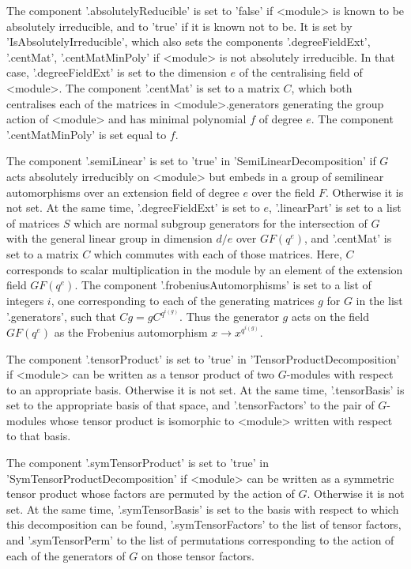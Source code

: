 The component  '.absolutelyReducible' is  set  to 'false' if  <module> is
known to be  absolutely irreducible, and to 'true'  if it is known not to
be.  It  is  set   by  'IsAbsolutelyIrreducible',  which  also  sets  the
components '.degreeFieldExt',   '.centMat', '.centMatMinPoly' if <module>
is not absolutely irreducible.  In that case, '.degreeFieldExt' is set to
the dimension $e$ of the  centralising field of <module>.  The  component
'.centMat' is set to  a matrix $C$,  which both  centralises each  of the
matrices  in <module>.generators generating  the group action of <module>
and   has   minimal   polynomial  $f$  of  degree  $e$.    The  component
'.centMatMinPoly' is set equal to $f$.

The component '.semiLinear' is set to 'true' in 'SemiLinearDecomposition'
if $G$ acts  absolutely irreducibly on <module>  but embeds in a group of
semilinear  automorphisms over an extension field  of degree $e$ over the
field $F$.  Otherwise it is not set.  At the same time, '.degreeFieldExt'
is set to $e$, '.linearPart'  is set to a list  of matrices $S$ which are
normal subgroup  generators for the intersection  of $G$ with the general
linear group in dimension $d/e$ over $GF(q^e)$, and  '.centMat' is set to
a matrix $C$  which  commutes with  each  of those  matrices.  Here,  $C$
corresponds to scalar multiplication in  the module by  an element of the
extension   field $GF(q^e)$.  The  component '.frobeniusAutomorphisms' is
set to a   list  of integers  $i$, one    corresponding to each  of   the
generating matrices $g$ for $G$ in the  list '.generators', such that $Cg
= gC^{q^{i(g)}}$. Thus  the generator $g$  acts on the field $GF(q^e)$ as
the Frobenius automorphism $x \rightarrow x^{q^{i(g)}}$.

The component     '.tensorProduct'       is   set   to     'true'      in
'TensorProductDecomposition'  if <module>  can   be written as  a  tensor
product  of  two  $G$-modules  with respect   to  an  appropriate  basis.
Otherwise it is not set.  At the same time,  '.tensorBasis' is set to the
appropriate basis of  that space,  and '.tensorFactors'  to the  pair  of
$G$-modules  whose tensor product  is isomorphic to <module> written with
respect to that basis.

The    component     '.symTensorProduct'   is     set    to   'true'   in
'SymTensorProductDecomposition' if <module> can be written as a symmetric
tensor  product  whose  factors  are permuted  by  the   action  of  $G$.
Otherwise it is not set.   At the same time,  '.symTensorBasis' is set to
the   basis with  respect to   which  this decomposition  can be   found,
'.symTensorFactors' to the list  of tensor factors, and  '.symTensorPerm'
to  the list of  permutations corresponding to the action  of each of the
generators of $G$ on those tensor factors.

